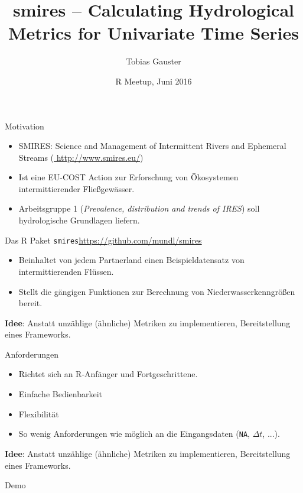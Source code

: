 \documentclass[xetex, german]{beamer}
\title{smires -- Calculating Hydrological Metrics for Univariate Time Series}
\author{Tobias Gauster}
\institute
{
    Institute of Applied Statistics and Computing\\
    BOKU, Vienna 
}
\date{R Meetup, Juni 2016}
\begin{document}
    
\begin{frame}
\titlepage
\end{frame}
 
\begin{frame}{Motivation}
  \begin{itemize}
      \item SMIRES: Science and Management of Intermittent Rivers and Ephemeral Streams (\url{ http://www.smires.eu/})
      \item Ist eine EU-COST Action zur Erforschung von Ökosystemen intermittierender Fließgewässer.
      \item Arbeitsgruppe 1 (\textit{Prevalence, distribution and trends of IRES}) soll hydrologische Grundlagen liefern.   
  \end{itemize}
\end{frame}
 
\begin{frame}{Das R Paket \texttt{smires}}{\url{https://github.com/mundl/smires}}
\begin{itemize}
    \item Beinhaltet von jedem Partnerland einen Beispieldatensatz von intermittierenden Flüssen. 
    \item Stellt die gängigen Funktionen zur Berechnung von Niederwasserkenngrößen bereit.
\end{itemize}

\vfill

\textbf{Idee}: Anstatt unzählige (ähnliche) Metriken zu implementieren, Bereitstellung eines Frameworks.

\vfill
\end{frame}

\begin{frame}{Anforderungen}
\begin{itemize}
    \item Richtet sich an R-Anfänger und Fortgeschrittene. 
    \item Einfache Bedienbarkeit
    \item Flexibilität
    \item So wenig Anforderungen wie möglich an die Eingangsdaten (\texttt{NA}, $\Delta t$, ...).
\end{itemize}

\textbf{Idee}: Anstatt unzählige (ähnliche) Metriken zu implementieren, Bereitstellung eines Frameworks.
\end{frame}

\begin{frame}{Demo}
\end{frame}
\end{document}
